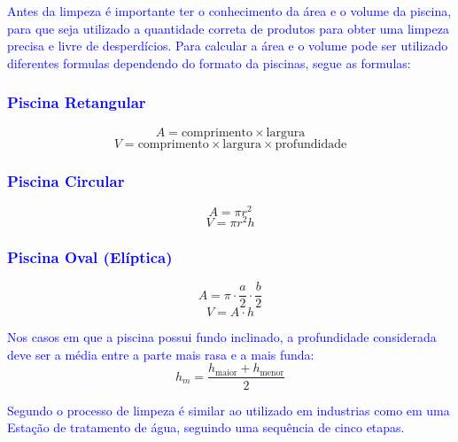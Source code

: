         \textcolor{blue}{Antes da limpeza é importante ter o conhecimento da área e o volume da piscina, para que seja utilizado a quantidade correta de produtos para obter uma limpeza precisa e livre de desperdícios. Para calcular a área e o volume pode ser utilizado diferentes formulas dependendo do formato da piscinas, segue as formulas:}

        \subsubsection*{\textcolor{blue}{Piscina Retangular}}
        
            \[
            A = \text{comprimento} \times \text{largura}
            \]
            \[
            V = \text{comprimento} \times \text{largura} \times \text{profundidade}
            \]
            
        \subsubsection*{\textcolor{blue}{Piscina Circular}}
            \[
            A = \pi r^2
            \]
            \[
            V = \pi r^2 h
            \]
            
        \subsubsection*{\textcolor{blue}{Piscina Oval (Elíptica)}}
            \[
            A = \pi \cdot \frac{a}{2} \cdot \frac{b}{2}
            \]
            \[
            V = A \cdot h
            \]
            
            \textcolor{blue}{Nos casos em que a piscina possui fundo inclinado, a profundidade considerada deve ser a média entre a parte mais rasa e a mais funda:}
            \[
            h_m = \frac{h_{\text{maior}} + h_{\text{menor}}}{2}
            \]
            

        \textcolor{blue}{Segundo \cite{tccSilva} o processo de limpeza é similar ao utilizado em industrias como em uma Estação de tratamento de água, seguindo uma sequência de cinco etapas.}

